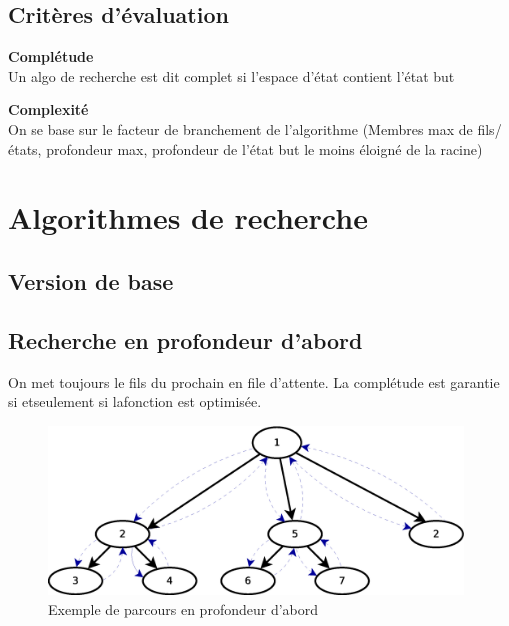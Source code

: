 \documentclass[12pt,a4paper,openany]{book}
\begin{document}
		\subsection{Critères d'évaluation}
		\begin{definition}
			\textbf{Complétude}\\ 
			Un algo de recherche est dit complet si l'espace d'état contient l'état but
		\end{definition}

		\begin{definition}
			\textbf{Complexité}\\
			On se base sur le facteur de branchement de l'algorithme (Membres max de fils/états, profondeur max, profondeur de l'état but le moins éloigné de la
			racine)
		\end{definition}
		\section{Algorithmes de recherche}
		\subsection{Version de base}
		
		
		\subsection{Recherche en profondeur d'abord}
		On met toujours le fils du prochain en file d'attente. La complétude est garantie si etseulement si lafonction est optimisée.

		\begin{figure}[H]
			\centering
			\includegraphics[width=11cm]{Diag1.eps}
			\caption{Exemple de parcours en profondeur d'abord}
		\end{figure}
\end{document}
